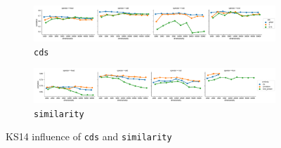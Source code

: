 \begin{figure}
  \centering

  \begin{subfigure}[t]{\textwidth}
    \includegraphics[width=1.1\textwidth]{supplement/figures/ks14-interaction-cds}

  \caption{\texttt{cds}}
  \label{fig:ks14-cds}
  \end{subfigure}

  \begin{subfigure}[t]{\textwidth}
    \includegraphics[width=1.1\textwidth]{supplement/figures/ks14-interaction-similarity}

  \caption{\texttt{similarity}}
  \label{fig:ks14-similarity}
  \end{subfigure}

  \caption{KS14 influence of \texttt{cds} and \texttt{similarity}}
\end{figure}

